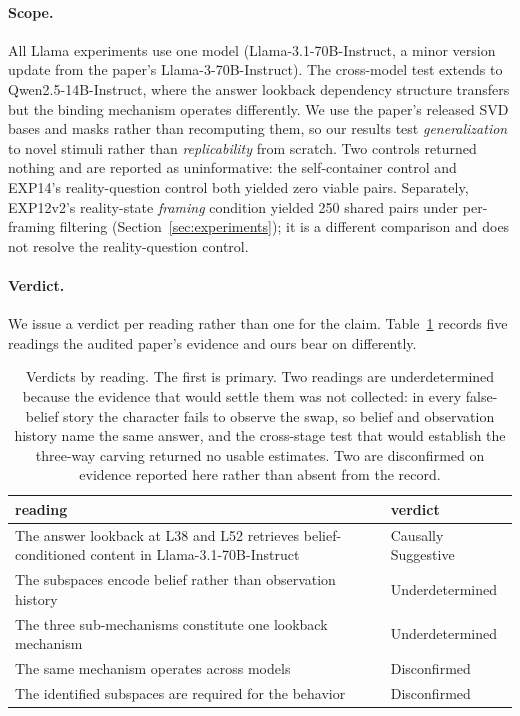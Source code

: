 \documentclass{article}
\begin{document}
\paragraph{Scope.}
All Llama experiments use one model (Llama-3.1-70B-Instruct, a minor version update from the paper's Llama-3-70B-Instruct). The cross-model test extends to Qwen2.5-14B-Instruct, where the answer lookback dependency structure transfers but the binding mechanism operates differently. We use the paper's released SVD bases and masks rather than recomputing them, so our results test \emph{generalization} to novel stimuli rather than \emph{replicability} from scratch. Two controls returned nothing and are reported as uninformative: the self-container control and EXP14's reality-question control both yielded zero viable pairs. Separately, EXP12v2's reality-state \emph{framing} condition yielded 250 shared pairs under per-framing filtering (Section~\ref{sec:experiments}); it is a different comparison and does not resolve the reality-question control.

\paragraph{Verdict.}
We issue a verdict per reading rather than one for the claim. Table~\ref{tab:readings}
records five readings the audited paper's evidence and ours bear on differently.

\begin{table}[h]
\centering
\small
\begin{tabular}{p{7.4cm}l}
\toprule
reading & verdict \\
\midrule
The answer lookback at L38 and L52 retrieves belief-conditioned content in
Llama-3.1-70B-Instruct & Causally Suggestive \\
The subspaces encode belief rather than observation history & Underdetermined \\
The three sub-mechanisms constitute one lookback mechanism & Underdetermined \\
The same mechanism operates across models & Disconfirmed \\
The identified subspaces are required for the behavior & Disconfirmed \\
\bottomrule
\end{tabular}
\caption{Verdicts by reading. The first is primary. Two readings are underdetermined
because the evidence that would settle them was not collected: in every false-belief story
the character fails to observe the swap, so belief and observation history name the same
answer, and the cross-stage test that would establish the three-way carving returned no
usable estimates. Two are disconfirmed on evidence reported here rather than absent from
the record.}
\label{tab:readings}
\end{table}
\end{document}
